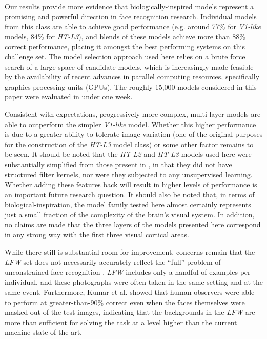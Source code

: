 
Our results provide more evidence that biologically-inspired models represent a promising
and powerful direction in face recognition research. Individual models from this
class are able to achieve good performance (e.g. around 77\% for \emph{V1-like} models,
84\% for \emph{HT-L3}), and blends of these models achieve more than 88\%
correct performance, placing it amongst the best performing systems on this challenge set.  
The model selection approach used here relies on a brute force search of a large space of candidate models, which is increasingly made feasible by the availability of recent advances in parallel computing resources, specifically graphics processing units (GPUs).  The roughly 15,000 models considered in this paper were evaluated in under one week.

Consistent with expectations, progressively more complex, multi-layer models are
able to outperform the simpler \emph{V1-like} model. Whether this higher
performance is due to a greater ability to tolerate image variation (one of the
original purposes for the construction of the \emph{HT-L3} model
class\cite{pinto:plos09}) or some other factor remains to be seen. It should be
noted that the \emph{HT-L2} and \emph{HT-L3} models used here were substantially
simplified from those present in \cite{pinto:plos09}, in that they did not have
structured filter kernels, nor were they subjected to any unsupervised learning.
Whether adding these features back will result in higher levels of performance
is an important future research question.  It should also be noted that, in terms of biological-inspiration, the model family tested here almost certainly represents just a small fraction of the complexity of the brain's visual system.  In addition, no claims are made that the three layers of the models presented here correspond in any strong way with the first three visual cortical areas.

While there still is substantial room for improvement, concerns remain that
the \emph{LFW} set does not necessarily accurately reflect the ``full'' problem
of unconstrained face recognition
\cite{pinto:eccv08,pinto:cvpr09,kumar:iccv09}.  \emph{LFW} includes only
a handful of examples per individual, and these photographs were often taken in
the same setting and at the same event.  Furthermore, Kumar et
al. \cite{kumar:iccv09} showed that human observers were able to perform at
greater-than-90\% correct even when the faces themselves were masked out of the
test images, indicating that the backgrounds in the \emph{LFW} are more than
sufficient for solving the task at a level higher than the current machine state
of the art.

